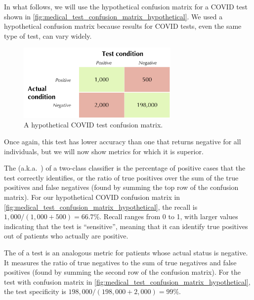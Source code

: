 In what follows, we will use the hypothetical confusion matrix for a COVID test shown in \autoref{fig:medical_test_confusion_matrix_hypothetical}. We used a hypothetical confusion matrix because results for COVID tests, even the same type of test, can vary widely.\\

\begin{figure}[h]
\centering
\mySfFamily
\includegraphics[width = 0.7\textwidth]{../images/medical_test_confusion_matrix_hypothetical.png}
\caption{A hypothetical COVID test confusion matrix.}
\label{fig:medical_test_confusion_matrix_hypothetical}
\end{figure}

\begin{qbox}\end{qbox}

Once again, this test has lower accuracy than one that returns negative for all individuals, but we will now show metrics for which it is superior.

The  (a.k.a.~) of a two-class classifier is the percentage of positive cases that the test correctly identifies, or the ratio of true positives over the sum of the true positives and false negatives (found by summing the top row of the confusion matrix). For our hypothetical COVID confusion matrix in \autoref{fig:medical_test_confusion_matrix_hypothetical}, the recall is $1,000/(1,000 + 500) = 66.7\%$. Recall ranges from 0 to 1, with larger values indicating that the test is ``sensitive'', meaning that it can identify true positives out of patients who actually are positive.

The  of a test is an analogous metric for patients whose actual status is negative. It measures the ratio of true negatives to the sum of true negatives and false positives (found by summing the second row of the confusion matrix). For the test with confusion matrix in \autoref{fig:medical_test_confusion_matrix_hypothetical}, the test specificity is $198,000/(198,000 + 2,000) = 99\%$.

